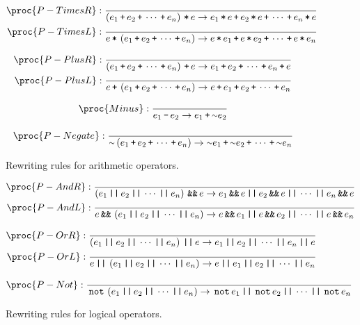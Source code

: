 \begin{figure*}[htbp!]
\begin{align*}
\proc{P-TimesR}:{\over
\p{e_1 \lp e_2 \lp \cdots \lp e_n} \lt e \rightarrow e_1\lt e \lp e_2\lt e \lp
\cdots \lp e_n \lt e
}\\
\proc{P-TimesL}:{\over
e\lt\p{e_1 \lp e_2 \lp \cdots \lp e_n} \rightarrow e\lt e_1 \lp e\lt e_2 \lp \cdots
\lp e\lt e_n
}
\end{align*}

\begin{align*}
\proc{P-PlusR}:{\over
\p{e_1 \lp e_2 \lp \cdots \lp e_n} \lp e \rightarrow e_1 \lp e_2 \lp \cdots \lp e_n \lp e
}\\
\proc{P-PlusL}:{\over
e \lp \p{e_1 \lp e_2 \lp \cdots \lp e_n} \rightarrow e \lp e_1 \lp e_2 \lp \cdots \lp e_n
}
\end{align*}

\begin{align*}
\proc{Minus}:{\over
e_1 \lm e_2 \rightarrow e_1 \lp \lneg e_2
}
\end{align*}

\begin{align*}
\proc{P-Negate}:{\over
\lneg\p{e_1 \lp e_2 \lp \cdots \lp e_n} \rightarrow \lneg e_1 \lp \lneg e_2 \lp \cdots
\lp \lneg e_n
}
\end{align*}


\caption[]{Rewriting rules for arithmetic operators.}
\label{figure:rewriting-arithop}
\end{figure*}


\begin{figure*}[htbp!]
\begin{align*}
\proc{P-AndR}:{\over
\p{e_1 \LOR e_2 \LOR \cdots \LOR e_n} \LAND e \rightarrow e_1\LAND e \LOR
e_2\LAND e \LOR \cdots \LOR e_n \LAND e
}\\
\proc{P-AndL}:{\over
e\LAND\p{e_1 \LOR e_2 \LOR \cdots \LOR e_n} \rightarrow e\LAND e_1 \LOR e\LAND
e_2 \LOR \cdots
\LOR e\LAND e_n
}
\end{align*}

\begin{align*}
\proc{P-OrR}:{\over
\p{e_1 \LOR e_2 \LOR \cdots \LOR e_n} \LOR e \rightarrow e_1 \LOR e_2 \LOR
\cdots \LOR e_n \LOR e
}\\
\proc{P-OrL}:{\over
e \LOR \p{e_1 \LOR e_2 \LOR \cdots \LOR e_n} \rightarrow e \LOR e_1 \LOR e_2
\LOR \cdots \LOR e_n
}
\end{align*}

\begin{align*}
\proc{P-Not}:{\over
\LNOT\p{e_1 \LOR e_2 \LOR \cdots \LOR e_n} \rightarrow \LNOT e_1 \LOR \LNOT e_2
\LOR \cdots \LOR \LNOT e_n
}
\end{align*}

\caption[]{Rewriting rules for logical operators.}
\label{figure:rewriting-logop}
\end{figure*}


